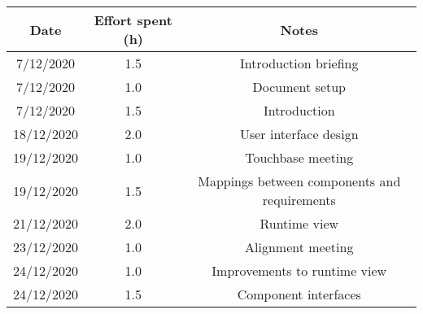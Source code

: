 \documentclass[../../main.tex]{subfiles}
\begin{document}
\begin{center}
    \begin{tabular}{|c| |c| |c|} 
        \hline
        Date & Effort spent (h) & Notes\\ [0.5ex] 
        \hline\hline
        7/12/2020 & 1.5 & Introduction briefing\\ 
        7/12/2020 & 1.0 & Document setup\\
        7/12/2020 & 1.5 & Introduction\\
        18/12/2020 & 2.0 & User interface design\\
        19/12/2020 & 1.0 & Touchbase meeting\\
        19/12/2020 & 1.5 & Mappings between components and requirements\\
        21/12/2020 & 2.0 & Runtime view\\
        23/12/2020 & 1.0 & Alignment meeting\\
        24/12/2020 & 1.0 & Improvements to runtime view\\
        24/12/2020 & 1.5 & Component interfaces\\
        \hline
    \end{tabular}
\end{center}
\end{document}

